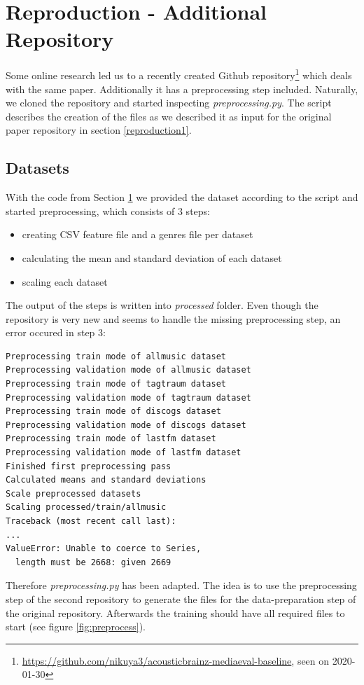\documentclass[sigconf,nonacm]{acmart}
\begin{document}
\section{Reproduction - Additional Repository}\label{reproduction2}

Some online research led us to a recently created Github repository\footnote{\url{https://github.com/nikuya3/acousticbrainz-mediaeval-baseline}, seen on 2020-01-30} which deals with the same paper. Additionally it has a preprocessing step included. Naturally, we cloned the repository and started inspecting \textit{preprocessing.py}. The script describes the creation of the files as we described it as input for the original paper repository in  section \ref{reproduction1}.

\subsection{Datasets}

With the code from Section \ref{reproduction2} we provided the dataset according to the script and started preprocessing, which consists of 3 steps:
\begin{itemize}
  \item creating CSV feature file and a genres file per dataset
  \item calculating the mean and standard deviation of each dataset
  \item scaling each dataset
\end{itemize}
The output of the steps is written into \textit{processed} folder.
Even though the repository is very new and seems to handle the missing preprocessing step, an error occured in step 3:

\begin{lstlisting}
Preprocessing train mode of allmusic dataset
Preprocessing validation mode of allmusic dataset
Preprocessing train mode of tagtraum dataset
Preprocessing validation mode of tagtraum dataset
Preprocessing train mode of discogs dataset
Preprocessing validation mode of discogs dataset
Preprocessing train mode of lastfm dataset
Preprocessing validation mode of lastfm dataset
Finished first preprocessing pass
Calculated means and standard deviations
Scale preprocessed datasets
Scaling processed/train/allmusic
Traceback (most recent call last):
...
ValueError: Unable to coerce to Series, 
  length must be 2668: given 2669
\end{lstlisting}

Therefore \textit{preprocessing.py} has been adapted. The idea is to use the preprocessing step of the second repository to generate the files for the data-preparation step of the original repository. Afterwards the training should have all required files to start (see figure \ref{fig:preprocess}).
\end{document}
